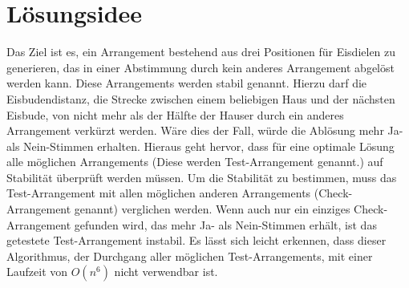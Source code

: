 \documentclass[a4paper,10pt,ngerman]{scrartcl}
\begin{document}
\section{Lösungsidee}
Das Ziel ist es, ein Arrangement bestehend aus drei Positionen für Eisdielen zu generieren, das in einer Abstimmung durch kein anderes Arrangement abgelöst werden kann.
Diese Arrangements werden stabil genannt.
Hierzu darf die Eisbudendistanz, die Strecke zwischen einem beliebigen Haus und der nächsten Eisbude, von nicht mehr als der Hälfte der Hauser durch ein anderes Arrangement verkürzt werden.
Wäre dies der Fall, würde die Ablösung mehr Ja- als Nein-Stimmen erhalten.
Hieraus geht hervor, dass für eine optimale Lösung alle möglichen Arrangements (Diese werden Test-Arrangement genannt.) auf Stabilität überprüft werden müssen.
Um die Stabilität zu bestimmen, muss das Test-Arrangement mit allen möglichen anderen Arrangements (Check-Arrangement genannt) verglichen werden.
Wenn auch nur ein einziges Check-Arrangement gefunden wird, das mehr Ja- als Nein-Stimmen erhält, ist das getestete Test-Arrangement instabil.
Es lässt sich leicht erkennen, dass dieser Algorithmus, der Durchgang aller möglichen Test-Arrangements, mit einer Laufzeit von $O(n^6)$ nicht verwendbar ist.
\end{document}
